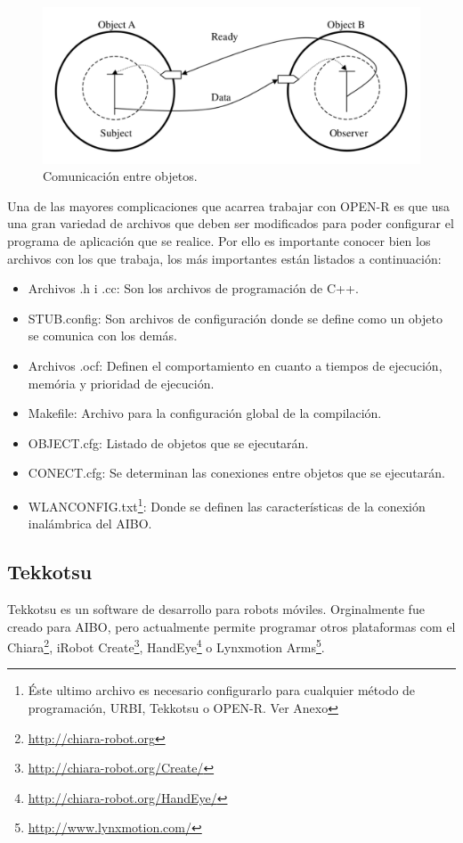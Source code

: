 \documentclass[12pt,a4paper,final,twoside]{book}
\begin{document}
\begin{figure}[h!]
	\centering
    \includegraphics[scale=0.5]{images/ObjectCom.pdf}
	 \caption{Comunicación entre objetos.}
  \label{fig:objectcom}
\end{figure}

Una de las mayores complicaciones que acarrea trabajar con OPEN-R es que usa una gran variedad de archivos que deben ser modificados para poder configurar el programa de aplicación que se realice. Por ello es importante conocer bien los archivos con los que trabaja, los más importantes están listados a continuación: 

\begin{itemize}
\item Archivos .h i .cc: Son los archivos de programación de C++.
\item STUB.config: Son archivos de configuración donde se define como un objeto se comunica con los demás.
\item Archivos .ocf: Definen el comportamiento en cuanto a tiempos de ejecución, memória y prioridad de ejecución.
\item Makefile: Archivo para la configuración global de la compilación.
\item OBJECT.cfg: Listado de objetos que se ejecutarán.
\item CONECT.cfg: Se determinan las conexiones entre objetos que se ejecutarán.
\item WLANCONFIG.txt\footnote{Éste ultimo archivo es necesario configurarlo para cualquier método de programación, URBI, Tekkotsu o OPEN-R. Ver Anexo }: Donde se definen las características de la conexión inalámbrica del AIBO.
\end{itemize}

\subsection{Tekkotsu}
Tekkotsu es un software de desarrollo para robots móviles. Orginalmente fue creado para AIBO, pero actualmente permite programar otros plataformas com el Chiara\footnote{\url{http://chiara-robot.org}}, iRobot Create\footnote{\url{http://chiara-robot.org/Create/}}, HandEye\footnote{\url{http://chiara-robot.org/HandEye/}} o Lynxmotion Arms\footnote{\url{http://www.lynxmotion.com/}}.
\end{document}
